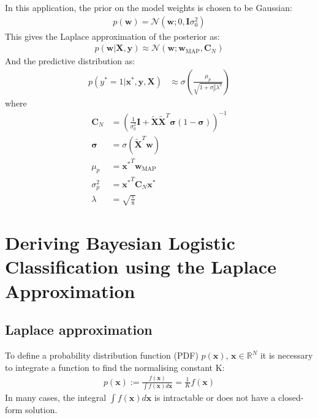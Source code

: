 \documentclass[a4paper]{article}
\begin{document}
    In this application, the prior on the model weights is chosen to be Gaussian:
    \begin{align}
        p(\bm{w}) = \mathcal{N}(\bm{w}; 0, \bm{I}\sigma_0^2)
    \end{align}
    This gives the Laplace approximation of the posterior as:
    \begin{align}
        p(\bm{w} | \bm{X}, \bm{y}) \approx \mathcal{N}(\bm{w}; \bm{w}_\text{MAP}, \bm{C}_N)
    \end{align}
    And the predictive distribution as:
    \begin{align}
         p(y^* = 1 | \bm{x}^*, \bm{y}, \bm{X}) &\approx \sigma\left(\frac{\mu_p}{\sqrt{1 + \sigma_p^2\lambda^2}}\right)
    \end{align}
    where
    \begin{align}
        \bm{C}_N &= \left(\frac{1}{\sigma_0^2}\bm{I} + \tilde{\bm{X}}\tilde{\bm{X}}^T \bm{\sigma} (1 - \bm{\sigma})\right)^{-1} \\
        \bm{\sigma} &= \sigma(\tilde{\bm{X}}^T \bm{w}) \\
        \mu_p &= {\bm{x}^*}^T \bm{w}_\text{MAP} \\
        \sigma_p^2 &= {\bm{x}^*}^T \bm{C}_N \bm{x^*} \\
        \lambda &= \sqrt{\frac{\pi}{8}}
    \end{align}

       \newpage
    \appendix
    \section{Deriving Bayesian Logistic Classification using the Laplace Approximation}
    \label{app:derivation}

    \subsection{Laplace approximation}\label{sec:laplace-approximation}

    To define a probability distribution function (PDF) $p(\bm{x})$, $\bm{x} \in \mathbb{R}^N$ it is necessary to integrate a function to find the normalising constant K:
    \begin{align}
        p(\bm{x}) := \frac{f(\bm{x})}{\int f(\bm{x}) d\bm{x}} = \frac{1}{K} f(\bm{x})
    \end{align}
    In many cases, the integral $\int f(\bm{x}) d\bm{x}$ is intractable or does not have a closed-form solution.
\end{document}
